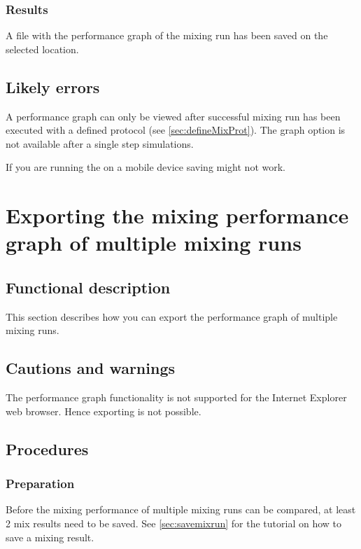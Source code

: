 \subsubsection{Results}
A file with the performance graph of the mixing run has been saved on the selected location.

\subsection{Likely errors}
A performance graph can only be viewed after successful mixing run has been executed with a defined protocol (see \ref{sec:defineMixProt}). The graph option is not available after a single step simulations.

If you are running the \applicationname on a mobile device saving might not work.


\section{Exporting the mixing performance graph of multiple mixing runs}
\label{sec:exportMultiGraph}

\subsection{Functional description}
This section describes how you can export the performance graph of multiple mixing runs.

\subsection{Cautions and warnings}
The performance graph functionality is not supported for the Internet Explorer web browser. Hence exporting is not possible.

\subsection{Procedures}
\subsubsection{Preparation}
Before the mixing performance of multiple mixing runs can be compared, at least 2 mix results need to be saved. See \ref{sec:savemixrun} for the tutorial on how to save a mixing result.


